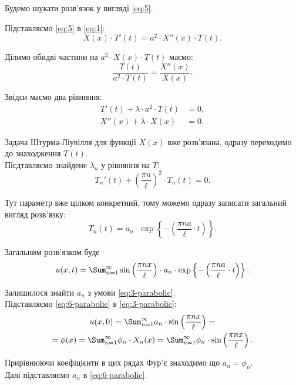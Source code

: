 \begin{solution}
	Будемо шукати розв'язок у вигляді \eqref{eq:5}.

	Підставляємо \eqref{eq:5} в \eqref{eq:1}:
	\begin{equation*}
		X(x) \cdot T'(t) = a^2 \cdot X''(x) \cdot T(t).
	\end{equation*}

	Ділимо обидві частини на $a^2 \cdot X(x) \cdot T(t)$ маємо:
	\begin{equation*}
		\frac{T(t)}{a^2 \cdot T(t)} = \frac{X''(x)}{X(x)}.
	\end{equation*}

	Звідси маємо два рівняння:
	\begin{align*}
		T'(t) + \lambda \cdot a^2 \cdot T(t) &= 0, \\
		X''(x) + \lambda \cdot X(x) &= 0.
	\end{align*}

	Задача Штурма-Ліувілля для функції $X(x)$ вже розв'язана, одразу переходимо до знаходження $T(t)$. \\

	Пісдтавляємо знайдене $\lambda_n$ у рівняння на $T$:
	\begin{equation*}
		T_n'(t) + \left( \frac{\pi n}{\ell} \right)^2 \cdot T_n(t) = 0.
	\end{equation*}

	Тут параметр вже цілком конкретний, тому можемо одразу записати загальний вигляд розв'язку:
	\begin{equation*}
		T_n(t) = a_n \cdot \exp \left\{ - \left( \frac{\pi n a}{\ell} \cdot t\right) \right\}.
	\end{equation*}
	
	Загальним розв'язком буде
	\begin{equation}
		\label{eq:6-parabolic}
		u(x, t) = \Sum_{n = 1}^\infty \sin \left( \frac{\pi n x}{\ell} \right) \cdot a_n \cdot \exp \left\{ - \left( \frac{\pi n a}{\ell} \cdot t\right) \right\}.
	\end{equation}

	Залишилося знайти $a_n$ з умови \eqref{eq:3-parabolic}. \\

	Підставляємо \eqref{eq:6-parabolic} в \eqref{eq:3-parabolic}:
	\begin{multline*}
		u(x, 0) = \Sum_{n = 1}^\infty a_n \cdot \sin \left( \frac{\pi n x}{\ell} \right) = \\ = \phi(x) = \Sum_{n = 1}^\infty \phi_n \cdot X_n(x) = \Sum_{n = 1}^\infty \phi_n \cdot \sin \left( \frac{\pi n x}{\ell} \right).
	\end{multline*}

	Прирівнюючи коефіцієнти в цих рядах Фур'є знаходимо що $a_n = \phi_n$.\\

	Далі підставляємо $a_n$ в \eqref{eq:6-parabolic}.
\end{solution}


